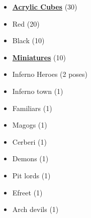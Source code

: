 \begin{multicols}{3}
\begin{itemize}[leftmargin=0pt, label={}, noitemsep, noitemsep]
  \item \textbf{\underline{Acrylic Cubes}} (30)
  \item Red (20)
  \item Black (10)
\end{itemize}

\begin{itemize}[leftmargin=0pt, label={}, noitemsep, noitemsep]
  \item \textbf{\underline{Miniatures}} (10)
  \item Inferno Heroes (2 poses)
  \item Inferno town (1)
  \item Familiars (1)
  \item Magogs (1)
  \item Cerberi (1)
  \item Demons (1)
  \item Pit lords (1)
  \item Efreet (1)
  \item Arch devils (1)
\end{itemize}


\end{multicols}
